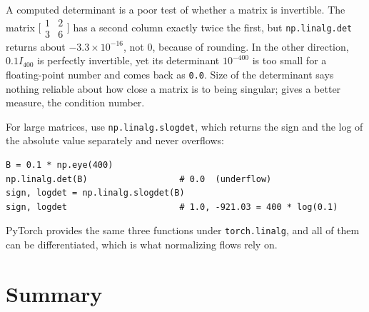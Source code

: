 \begin{warning}
  A computed determinant is a poor test of whether a matrix is invertible.
  The matrix $\bigl[\begin{smallmatrix} 1 & 2 \\ 3 & 6
  \end{smallmatrix}\bigr]$ has a second column exactly twice the first,
  but \texttt{np.linalg.det} returns about $-3.3 \times 10^{-16}$, not
  $0$, because of rounding. In the other direction, $0.1 I_{400}$ is
  perfectly invertible, yet its determinant $10^{-400}$ is too small for a
  floating-point number and comes back as \texttt{0.0}. Size of the
  determinant says nothing reliable about how close a matrix is to being
  singular;  gives a better measure, the condition number.
\end{warning}

For large matrices, use \texttt{np.linalg.slogdet}, which returns the
sign and the log of the absolute value separately and never overflows:

\begin{lstlisting}
B = 0.1 * np.eye(400)
np.linalg.det(B)                  # 0.0  (underflow)
sign, logdet = np.linalg.slogdet(B)
sign, logdet                      # 1.0, -921.03 = 400 * log(0.1)
\end{lstlisting}

PyTorch provides the same three functions under \texttt{torch.linalg},
and all of them can be differentiated, which is what normalizing flows
rely on.

\section{Summary}
\label{sec:ch03-summary}

